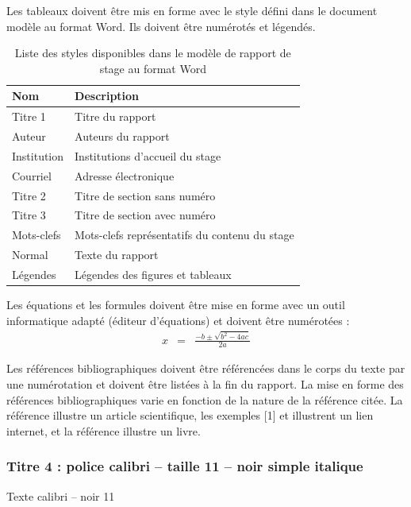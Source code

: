 \documentclass{rapportDeProjetENSICAEN}
\begin{document}
Les tableaux doivent être mis en forme avec le style défini dans le document modèle au format Word. Ils doivent être numérotés et légendés.
\begin{table}[!h]
    \centering	
    \caption{\textup{Liste des styles disponibles dans le modèle de rapport de stage au format Word}}
	\begin{tabular}{ll}
	    Nom         & Description                                   \\ \hline \hline
        Titre 1     & Titre du rapport                              \\ \hline
        Auteur      & Auteurs du rapport                            \\ \hline
        Institution & Institutions d’accueil du stage               \\ \hline
        Courriel	& Adresse électronique                          \\ \hline
        Titre 2	    & Titre de section sans numéro                  \\ \hline
        Titre 3	    & Titre de section avec numéro                  \\ \hline
        Mots-clefs	& Mots-clefs représentatifs du contenu du stage \\ \hline
        Normal	    & Texte du rapport                              \\ \hline
        Légendes	& Légendes des figures et tableaux              \\ \hline
	\end{tabular}
    \label{tableau1}
\end{table}


Les équations et les formules doivent être mise en forme avec un outil informatique adapté (éditeur d’équations) et doivent être numérotées :  
\begin{eqnarray}
   x & = & \frac{-b\pm \sqrt{b^2-4ac}}{2a}
\end{eqnarray}


Les références bibliographiques doivent être référencées\cite{ensicaenURL} dans le corps du texte par une numérotation et doivent être listées à la fin du rapport. La mise en forme des références bibliographiques varie en fonction de la nature de la référence citée. La référence \cite{troisiemeCentenaireNewton} illustre un article scientifique, les exemples [1] et \cite{wordURL} illustrent un lien internet,  et la référence \cite{theLatexCompanion} illustre un livre.

\subsubsection{Titre 4 : police calibri – taille 11 – noir simple italique}
Texte calibri – noir 11
\end{document}
